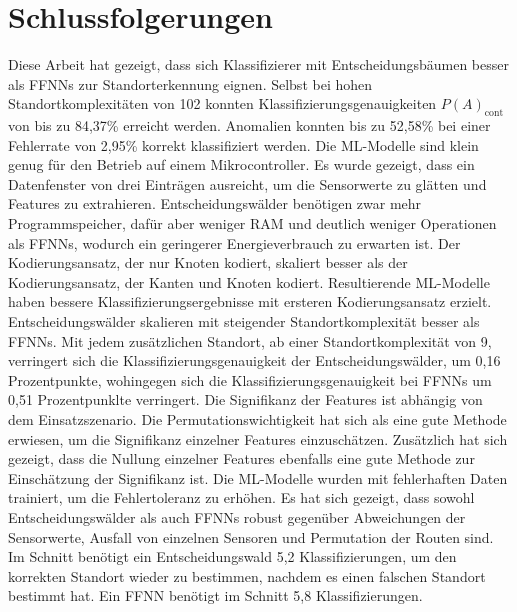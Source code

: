 \chapter{Schlussfolgerungen}
Diese Arbeit hat gezeigt, dass sich Klassifizierer mit Entscheidungsbäumen besser als FFNNs zur Standorterkennung eignen.
Selbst bei hohen Standortkomplexitäten von 102 konnten Klassifizierungsgenauigkeiten $P(A)_{\text{cont}}$ von bis zu 84,37\% erreicht werden.
Anomalien konnten bis zu 52,58\% bei einer Fehlerrate von 2,95\% korrekt klassifiziert werden.
\newline
\newline
Die ML-Modelle sind klein genug für den Betrieb auf einem Mikrocontroller.
Es wurde gezeigt, dass ein Datenfenster von drei Einträgen ausreicht, um die Sensorwerte zu glätten und Features zu extrahieren.
Entscheidungswälder benötigen zwar mehr Programmspeicher, dafür aber weniger RAM und deutlich weniger Operationen als FFNNs, wodurch
ein geringerer Energieverbrauch zu erwarten ist.
\newline
\newline
Der Kodierungsansatz, der nur Knoten kodiert, skaliert besser als der Kodierungsansatz, der Kanten und Knoten kodiert.
Resultierende ML-Modelle haben bessere Klassifizierungsergebnisse mit ersteren Kodierungsansatz erzielt.
Entscheidungswälder skalieren mit steigender Standortkomplexität besser als FFNNs.
Mit jedem zusätzlichen Standort, ab einer Standortkomplexität von 9, verringert sich die Klassifizierungsgenauigkeit der Entscheidungswälder,
um 0,16 Prozentpunkte, wohingegen sich die Klassifizierungsgenauigkeit bei FFNNs um 0,51 Prozentpunklte verringert.
\newline
\newline
Die Signifikanz der Features ist abhängig von dem Einsatzszenario.
Die Permutationswichtigkeit hat sich als eine gute Methode erwiesen, um die Signifikanz einzelner Features einzuschätzen.
Zusätzlich hat sich gezeigt, dass die Nullung einzelner Features ebenfalls eine gute Methode zur Einschätzung der Signifikanz ist.
\newpage
Die ML-Modelle wurden mit fehlerhaften Daten trainiert, um die Fehlertoleranz zu erhöhen.
Es hat sich gezeigt, dass sowohl Entscheidungswälder als auch FFNNs robust gegenüber Abweichungen der Sensorwerte,
Ausfall von einzelnen Sensoren und Permutation der Routen sind.
Im Schnitt benötigt ein Entscheidungswald 5,2 Klassifizierungen, um den korrekten Standort wieder zu bestimmen,
nachdem es einen falschen Standort bestimmt hat.
Ein FFNN benötigt im Schnitt 5,8 Klassifizierungen.
